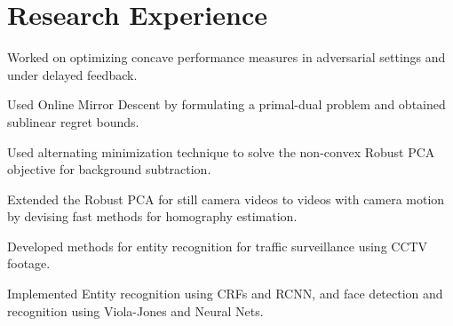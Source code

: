 \documentclass[US paper]{deedy-resume} %
\begin{document}
{\vspace{1mm}
\vspace{-2.5pt}


\section{Research Experience}
\vspace{-4pt}
\begin{tightitemize}
\item Worked on optimizing concave performance measures in adversarial settings and under delayed feedback.
\item Used Online Mirror Descent by formulating a primal-dual problem and obtained sublinear regret bounds.
\end{tightitemize}
\vspace{1mm}



\begin{tightitemize}
\item Used alternating minimization technique to solve the non-convex Robust PCA objective for background subtraction.
\item Extended the Robust PCA for still camera videos to videos with camera motion by devising fast methods for homography estimation.
\end{tightitemize}
\vspace{1mm}



\begin{tightitemize}
\item Developed methods for entity recognition for traffic surveillance using CCTV footage.
\item Implemented Entity recognition using CRFs and RCNN, and face detection and recognition using Viola-Jones and Neural Nets.
\end{tightitemize}
\vspace{1mm}

}
\end{document}
